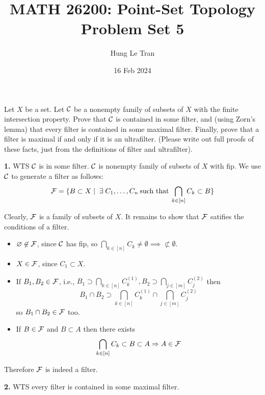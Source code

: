 \documentclass[a4paper, 10pt]{article}
\title{MATH 26200: Point-Set Topology \\ \large Problem Set 5}
\date{16 Feb 2024}
\author{Hung Le Tran}
\begin{document}
\maketitle
\setcounter{section}{5}
\begin{problem} 
    Let $X$ be a set. Let $\mathcal{C}$ be a nonempty family of subsets of $X$ with the finite intersection property. Prove that $\mathcal{C}$ is contained in some filter, and (using Zorn's lemma) that every filter is contained in some maximal filter. Finally, prove that a filter is maximal if and only if it is an ultrafilter. (Please write out full proofs of these facts, just from the definitions of filter and ultrafilter).
\end{problem}
\begin{solution}
    \textbf{1.} WTS $\mathcal{C}$ is in some filter.
    $\mathcal{C}$ is nonempty family of subsets of $X$ with fip. We use $\mathcal{C}$ to generate a filter as follows:
    \begin{equation*}
    \calf = \{B \subset X \mid \exists C_1, \ldots, C_n \:\text{such that}\: \bigcap_{k \in [n]} C_k \subset B\}
    \end{equation*}

    Clearly, $\mathcal{F}$ is a family of subsets of $X$. It remains to show that $\mathcal{F}$ satifies the conditions of a filter.

    \begin{itemize}
    \item $\varnothing \not \in \mathcal{F}$, since $\mathcal{C}$ has fip, so $\bigcap_{k \in [n]} C_k \neq \emptyset \implies \not \subset \emptyset$.
    \item $X \in \mathcal{F}$, since $C_1 \subset X$.
    \item If $B_1, B_2 \in \mathcal{F}$, i.e., $B_1 \supset \bigcap_{k \in [n]} C^{(1)}_k,  B_2 \supset \bigcap_{j \in [m]} C^{(2)}_j$ then \begin{equation*}
    B_1 \cap B_2 \supset \bigcap_{k \in [n]} C^{(1)}_k \cap \bigcap_{j \in [m]} C^{(2)}_j
    \end{equation*}
    so $B_1 \cap B_2 \in \mathcal{F}$ too.
    \item If $B \in \mathcal{F}$ and $B \subset A$ then there exists \begin{equation*}
    \bigcap_{k \in [n]} C_k \subset B \subset A \Rightarrow A \in \mathcal{F}
    \end{equation*}
    \end{itemize}
    Therefore $\mathcal{F}$ is indeed a filter.

    \textbf{2.} WTS every filter is contained in some maximal filter.


\end{solution}
\end{document}
